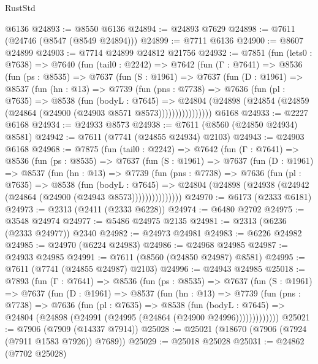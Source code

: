 \begin{lexlean}{RustStd}
\begin{coremodule}
{\begin{coremodule}
{{{{{{{{{{{{{{{{{{{{{{{{{{{{{{{{{{    @6136
@24893 := @8550 @6136
@24894 := @24893 @7629
@24898 := @7611 (@24746 (@8547 (@8549 @24894)))
@24899 := @7711 @6136
@24900 := @8607 @24899
@24903 := @7714 @24899 @24812 @21756
@24932 := @7851
    (fun (lets0 : @7638) =>
    @7640
      (fun (tail0 : @2242) =>
      @7642
        (fun (Γ : @7641) =>
        @8536
          (fun (ps : @8535) =>
          @7637
            (fun (S : @1961) =>
            @7637
              (fun (D : @1961) =>
              @8537
                (fun (hn : @13) =>
                @7739
                  (fun (pns : @7738) =>
                  @7636
                    (fun (pl : @7635) =>
                    @8538
                      (fun (bodyL : @7645) =>
                      @24804
                        (@24898 (@24854 (@24859 (@24864 (@24900 (@24903 @8571 @8573))))))))))))))))
    @6168
@24933 := @2227 @6168
@24934 := @24933 @8573
@24938 := @7611 (@8560 (@24850 @24934) @8581)
@24942 := @7611 (@7741 (@24855 @24934) @2103)
@24943 := @24903 @6168
@24968 := @7875
    (fun (tail0 : @2242) =>
    @7642
      (fun (Γ : @7641) =>
      @8536
        (fun (ps : @8535) =>
        @7637
          (fun (S : @1961) =>
          @7637
            (fun (D : @1961) =>
            @8537
              (fun (hn : @13) =>
              @7739
                (fun (pns : @7738) =>
                @7636
                  (fun (pl : @7635) =>
                  @8538
                    (fun (bodyL : @7645) =>
                    @24804 (@24898 (@24938 (@24942 (@24864 (@24900 (@24943 @8573)))))))))))))))
@24970 := @6173 (@2333 @6181)
@24973 := @2313 (@2411 (@2333 @6228))
@24974 := @6480 @2702
@24975 := @3548 @24974
@24977 := @5486 @24975 @2135
@24981 := @2313 (@6236 (@2333 @24977)) @2340
@24982 := @24973 @24981
@24983 := @6226 @24982
@24985 := @24970 (@6224 @24983)
@24986 := @24968 @24985
@24987 := @24933 @24985
@24991 := @7611 (@8560 (@24850 @24987) @8581)
@24995 := @7611 (@7741 (@24855 @24987) @2103)
@24996 := @24943 @24985
@25018 := @7893
    (fun (Γ : @7641) =>
    @8536
      (fun (ps : @8535) =>
      @7637
        (fun (S : @1961) =>
        @7637
          (fun (D : @1961) =>
          @8537
            (fun (hn : @13) =>
            @7739
              (fun (pns : @7738) =>
              @7636
                (fun (pl : @7635) =>
                @8538
                  (fun (bodyL : @7645) =>
                  @24804 (@24898 (@24991 (@24995 (@24864 (@24900 @24996)))))))))))))
@25021 := @7906 (@7909 (@14337 @7914))
@25028 := @25021 (@18670 (@7906 (@7924 (@7911 @1583 @7926)) @7689))
@25029 := @25018 @25028
@25031 := @24862 (@7702 @25028)
}}}}}}}}}}}}}}}}}}}}}}}}}}}}}}}}}}
\end{coremodule}}
\end{coremodule}
\end{lexlean}
